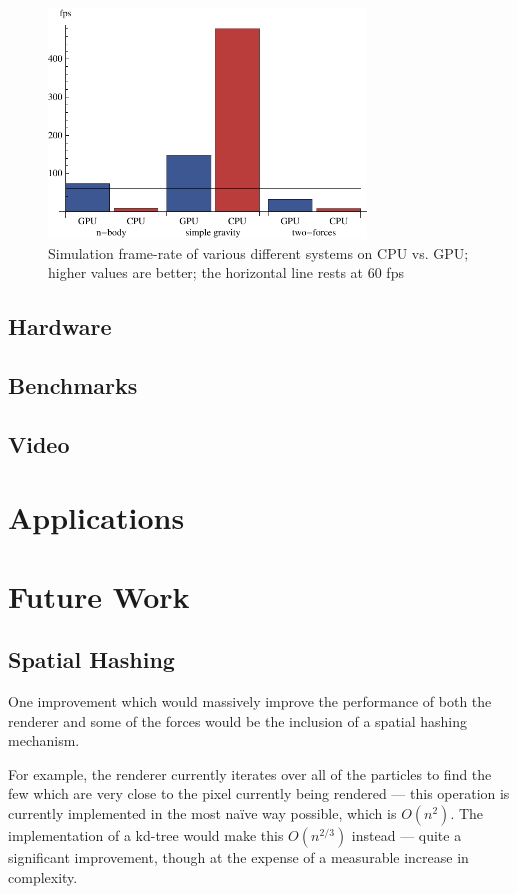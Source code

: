 \documentclass{acmsiggraph}
\begin{document}
\begin{figure}
    \includegraphics[width=84.5mm]{basicSpeedPlot.pdf}
    \caption{Simulation frame-rate of various different systems on CPU vs. GPU; higher values are better; the horizontal line rests at 60 fps}
    \label{fig:basicSpeedPlot}
\end{figure}

\subsection{Hardware}

\subsection{Benchmarks}

\subsection{Video}

\section{Applications}

\section{Future Work}

\subsection{Spatial Hashing}

One improvement which would massively improve the performance of both the renderer and some of the forces would be the inclusion of a spatial hashing mechanism.

For example, the renderer currently iterates over all of the particles to find the few which are very close to the pixel currently being rendered --- this operation is currently implemented in the most na\"{i}ve way possible, which is $O(n^2)$. The implementation of a kd-tree would make this $O(n^{2/3})$ instead --- quite a significant improvement, though at the expense of a measurable increase in complexity.
\end{document}
